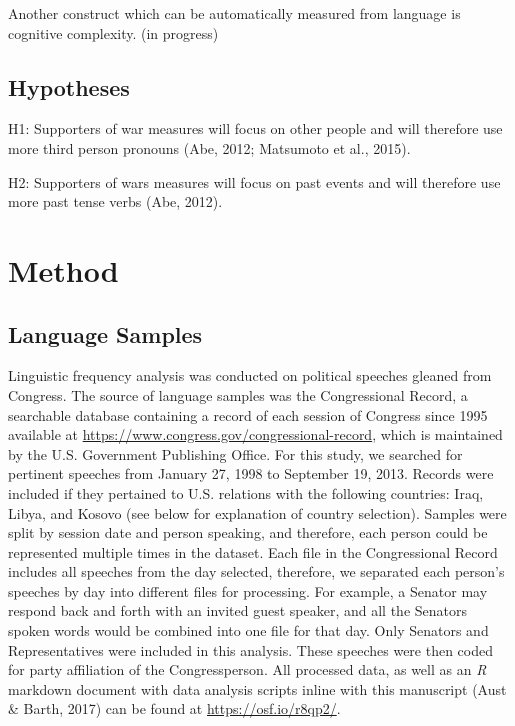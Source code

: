 \documentclass[english,,man]{apa6}
\theoremstyle{definition}
\theoremstyle{definition}
\theoremstyle{definition}
\theoremstyle{remark}
\begin{document}
Another construct which can be automatically measured from language is
cognitive complexity. (in progress)

\hypertarget{hypotheses}{%
\subsection{Hypotheses}\label{hypotheses}}

H1: Supporters of war measures will focus on other people and will
therefore use more third person pronouns (Abe, 2012; Matsumoto et al.,
2015).

H2: Supporters of wars measures will focus on past events and will
therefore use more past tense verbs (Abe, 2012).

\hypertarget{method}{%
\section{Method}\label{method}}

\hypertarget{language-samples}{%
\subsection{Language Samples}\label{language-samples}}

Linguistic frequency analysis was conducted on political speeches
gleaned from Congress. The source of language samples was the
Congressional Record, a searchable database containing a record of each
session of Congress since 1995 available at
\url{https://www.congress.gov/congressional-record}, which is maintained
by the U.S. Government Publishing Office. For this study, we searched
for pertinent speeches from January 27, 1998 to September 19, 2013.
Records were included if they pertained to U.S. relations with the
following countries: Iraq, Libya, and Kosovo (see below for explanation
of country selection). Samples were split by session date and person
speaking, and therefore, each person could be represented multiple times
in the dataset. Each file in the Congressional Record includes all
speeches from the day selected, therefore, we separated each person's
speeches by day into different files for processing. For example, a
Senator may respond back and forth with an invited guest speaker, and
all the Senators spoken words would be combined into one file for that
day. Only Senators and Representatives were included in this analysis.
These speeches were then coded for party affiliation of the
Congressperson. All processed data, as well as an \emph{R} markdown
document with data analysis scripts inline with this manuscript (Aust \&
Barth, 2017) can be found at \url{https://osf.io/r8qp2/}.
\end{document}
